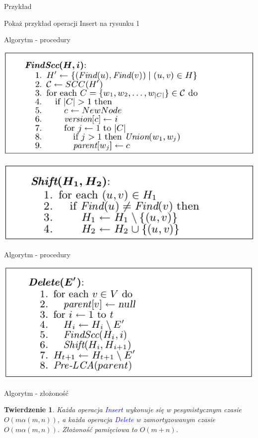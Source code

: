 \documentclass{beamer}
\newtheorem{tw}{Twierdzenie}
\newcommand{\emp}[1]{\textcolor{blue}{\textit{#1}}}
\begin{document}
\begin{frame}{Przykład}
\centerline{\Large Pokaż przykład operacji Insert na rysunku 1}
\end{frame}


\begin{frame}{Algorytm - procedury}
\begin{center}
\includegraphics[scale=0.4]{img/FindScc.png}
\end{center}

\begin{center}
\includegraphics[scale=0.4]{img/Shift.png}
\end{center}
\end{frame}

\begin{frame}{Algorytm - procedury}
\begin{center}
\includegraphics[scale=0.4]{img/Delete.png}
\end{center}
\end{frame}

\begin{frame}{Algorytm - złożoność}
\begin{tw}
Każda operacja \emp{Insert} wykonuje się w pesymistycznym czasie $O(m \alpha(m,n))$, a każda operacja \emp{Delete} w zamortyzowanym czasie $O(m \alpha(m,n))$. Złożoność pamięciowa to $O(m + n)$.
\end{tw}
\end{frame}
\end{document}
